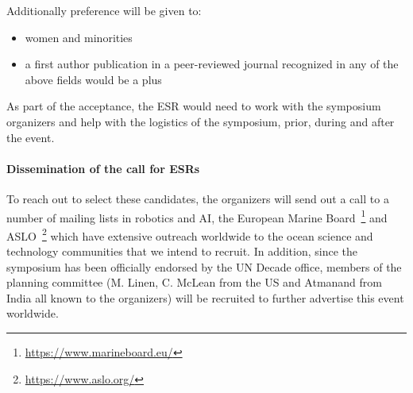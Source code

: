 \noindent
Additionally preference will be given to:

\begin{itemize}[noitemsep,topsep=0pt,parsep=0pt,partopsep=0pt]
\item women and minorities
\item a first author publication in a peer-reviewed journal recognized
  in any of the above fields would be a plus 
\end{itemize}

\noindent
As part of the acceptance, the ESR would need to work with the symposium
organizers and help with the logistics of the symposium, prior, during
and after the event. %

\paragraph{Dissemination of the call for ESRs} To reach out to select
these candidates, the organizers will send out a call to a number of
mailing lists in robotics and AI, the European Marine
Board~\footnote{\url{https://www.marineboard.eu/}} and
ASLO~\footnote{\url{https://www.aslo.org/}} which have extensive
outreach worldwide to the ocean science and technology communities
that we intend to recruit. In addition, since the symposium has been
officially endorsed by the UN Decade office, members of the planning
committee (M. Linen, C. McLean from the US and Atmanand from India all
known to the organizers) will be recruited to further advertise this
event worldwide. %
